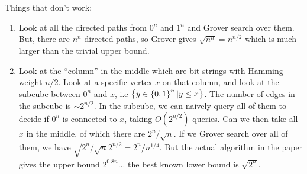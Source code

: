 Things that don't work:
\begin{enumerate}
    \item Look at all the directed paths from $0^n$ and $1^n$ and Grover search over them. But, there are $n^n$ directed paths, so Grover gives $\sqrt{n^n} = n^{n/2}$ which is much larger than the trivial upper bound.
    \item Look at the ``column'' in the middle which are bit strings with Hamming weight $n/2$. Look at a specific vertex $x$ on that column, and look at the subcube between $0^n$ and $x$, i.e $\set{y \in \set{0, 1}^n \vert y \leq x}$. The number of edges in the subcube is $\sim 2^{n/2}$. In the subcube, we can naively query all of them to decide if $0^n$ is connected to $x$, taking $O(2^{n/2})$ queries. Can we then take all $x$ in the middle, of which there are $2^n/\sqrt{n}$. If we Grover search over all of them, we have $\sqrt{2^n/\sqrt{n}}2^{n/2} = 2^{n}/n^{1/4}$. But the actual algorithm in the paper gives the upper bound $2^{0.8n}$... the best known lower bound is $\sqrt{2^n}$. 
\end{enumerate}
